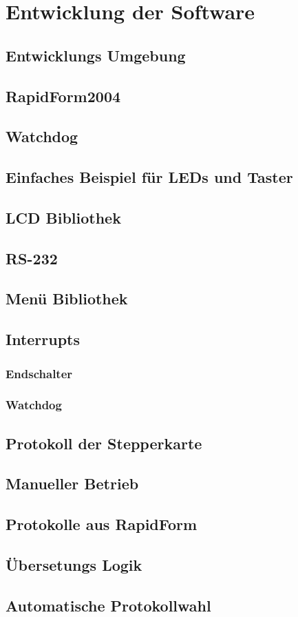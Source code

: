 \chapter{Entwicklung der Software}
\label{cha:Software}
\section{Entwicklungs Umgebung}

\lstset{language=Java, basicstyle=\footnotesize, showstringspaces=false, tabsize=2}

\section{RapidForm2004}
\label{sec:RapidForm}
\section{Watchdog}
\section{Einfaches Beispiel für LEDs und Taster}
\section{LCD Bibliothek}
\section{RS-232}
\section{Menü Bibliothek}
\section{Interrupts}
\subsection{Endschalter}
\subsection{Watchdog}
\section{Protokoll der Stepperkarte}
\section{Manueller Betrieb}
\section{Protokolle aus RapidForm}
\section{Übersetungs Logik}
\section{Automatische Protokollwahl}